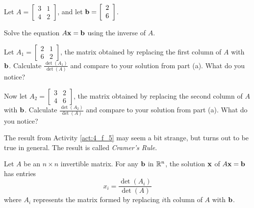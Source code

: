 \begin{activity} \label{act:4_f_5} Let $A = \left[ \begin{array}{cc} 3&1 \\ 4&2 \end{array} \right]$, and let $\mathbf{b} = \left[ \begin{array}{c}2\\6 \end{array} \right]$. 
\ba
\item Solve the equation $A \mathbf{x} = \mathbf{b}$ using the inverse of $A$. 



\item Let $A_1 =  \left[ \begin{array}{cc} 2&1 \\ 6&2 \end{array} \right]$, the matrix obtained by replacing the first column of $A$ with $\mathbf{b}$. Calculate $\frac{\det(A_1)}{\det(A)}$ and compare to your solution from part (a). What do you notice?



\item Now let $A_2 =  \left[ \begin{array}{cc} 3&2 \\ 4&6 \end{array} \right]$, the matrix obtained by replacing the second column of $A$ with $\mathbf{b}$. Calculate $\frac{\det(A_2)}{\det(A)}$ and compare to your solution from part (a). What do you notice?



\ea

\end{activity}



The result from Activity \ref{act:4_f_5} may seem a bit strange, but turns out to be true in general. The result is called \emph{Cramer's Rule}.



\begin{theorem}
Let $A$ be an $n\times n$ invertible matrix. For any $\mathbf{b}$ in $\mathbb{R}^n$, the solution $\mathbf{x}$ of $A\mathbf{x}=\mathbf{b}$ has entries
\[ x_i =\frac{\det(A_i)}{\det(A)} \]
where $A_i$ represents the matrix formed by replacing $i$th column of $A$ with $\mathbf{b}$.
\end{theorem}



